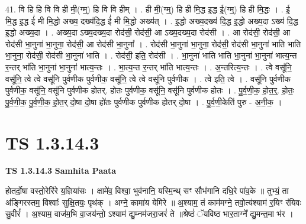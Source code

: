 \documentclass[17pt]{extarticle}
\begin{document}
41. वि हि हि वि वि ही मी॒(ग्म्॒) हि वि वि हीम् । . ही मी॒(ग्म्॒) हि ही मि॒द्ध इ॒द्ध ई॒(ग्म्॒) हि ही मि॒द्धः । . ई॒ मि॒द्ध इ॒द्ध ई॑ मी मि॒द्धो अख्य॒ दख्य॑दि॒द्ध ई॑ मी मि॒द्धो अख्य॑त् । . इ॒द्धो अख्य॒दख्य॑ दि॒द्ध इ॒द्धो अख्य॒दा ऽख्य॑ दि॒द्ध इ॒द्धो अख्य॒दा । . अख्य॒दा ऽख्य॒दख्य॒दा रोद॑सी॒ रोद॑सी॒ आ ऽख्य॒दख्य॒दा रोद॑सी । . आ रोद॑सी॒ रोद॑सी॒ आ रोद॑सी भा॒नुना॑ भा॒नुना॒ रोद॑सी॒ आ रोद॑सी भा॒नुना᳚ । . रोद॑सी भा॒नुना॑ भा॒नुना॒ रोद॑सी॒ रोद॑सी भा॒नुना॑ भाति भाति भा॒नुना॒ रोद॑सी॒ रोद॑सी भा॒नुना॑ भाति । . रोद॑सी॒ इति॒ रोद॑सी । . भा॒नुना॑ भाति भाति भा॒नुना॑ भा॒नुना॑ भात्य॒न्त र॒न्तर् भा॑ति भा॒नुना॑ भा॒नुना॑ भात्य॒न्तः । . भा॒त्य॒न्त र॒न्तर् भा॑ति भात्य॒न्तः । . अ॒न्तरित्य॒न्तः । . त्वे वसू॑नि॒ वसू॑नि॒ त्वे त्वे वसू॑नि पुर्वणीक पुर्वणीक॒ वसू॑नि॒ त्वे त्वे वसू॑नि पुर्वणीक । . त्वे इति॒ त्वे । . वसू॑नि पुर्वणीक पुर्वणीक॒ वसू॑नि॒ वसू॑नि पुर्वणीक होतर्. होतः पुर्वणीक॒ वसू॑नि॒ वसू॑नि पुर्वणीक होतः । . पु॒र्व॒णी॒क॒ हो॒त॒र्॒. हो॒तः॒ पु॒र्व॒णी॒क॒ पु॒र्व॒णी॒क॒ हो॒त॒र् दो॒षा दो॒षा हो॑तः पुर्वणीक पुर्वणीक होतर् दो॒षा । . पु॒र्व॒णी॒केति॑ पुरु - अ॒नी॒क॒ । \newline
\pagebreak
{}

\section{ TS 1.3.14.3 }

\textbf{TS 1.3.14.3 } \newline
\textbf{Samhita Paata} \newline

होतर्दो॒षा वस्तो॒रेरि॑रे य॒ज्ञिया॑सः । क्षामे॑व॒ विश्वा॒ भुव॑नानि॒ यस्मि॒न्थ् सꣳ सौभ॑गानि दधि॒रे पा॑व॒के ॥ तुभ्यं॒ ता अ॑ङ्गिरस्तम॒ विश्वाः᳚ सुक्षि॒तयः॒ पृथ॑क् । अग्ने॒ कामा॑य येमिरे ॥ अ॒श्याम॒ तं काम॑मग्ने॒ तवो॒त्य॑श्याम॑ र॒यिꣳ र॑यिवः सु॒वीरं᳚ । अ॒श्याम॒ वाज॑म॒भि वा॒जय॑न्तो॒ ऽश्याम॑ द्यु॒म्नम॑जरा॒जरं॑ ते ॥श्रेष्ठं॑ ॅयविष्ठ भार॒ताग्ने᳚ द्यु॒मन्त॒मा भ॑र । \newline
\end{document}
